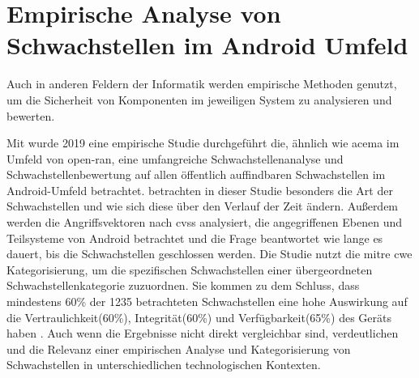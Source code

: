 \section{Empirische Analyse von Schwachstellen im Android Umfeld}
\label{sec:forschungsstand-android}
Auch in anderen Feldern der Informatik werden empirische Methoden genutzt, um die Sicherheit von Komponenten im jeweiligen System zu analysieren und bewerten.
\par Mit  wurde 2019 eine empirische Studie durchgeführt die, ähnlich wie \gls{acema} im Umfeld von \gls{open-ran}, eine umfangreiche Schwachstellenanalyse und Schwachstellenbewertung auf allen öffentlich auffindbaren Schwachstellen im Android-Umfeld betrachtet. \citeauthor{mazuera-rozoAndroidOSStack2019} betrachten in dieser Studie besonders die Art der Schwachstellen und wie sich diese über den Verlauf der Zeit ändern. Außerdem werden die Angriffsvektoren nach \gls{cvss} analysiert, die angegriffenen Ebenen und Teilsysteme von Android betrachtet und die Frage beantwortet wie lange es dauert, bis die Schwachstellen geschlossen werden. Die Studie nutzt die \gls{mitre} \gls{cwe} Kategorisierung, um die spezifischen Schwachstellen einer übergeordneten Schwachstellenkategorie zuzuordnen. Sie kommen zu dem Schluss, dass mindestens 60\% der 1235 betrachteten Schwachstellen eine hohe Auswirkung auf die Vertraulichkeit(60\%), Integrität(60\%) und Verfügbarkeit(65\%) des Geräts haben \autocite{mazuera-rozoAndroidOSStack2019}. Auch wenn die Ergebnisse nicht direkt vergleichbar sind, verdeutlichen \autocite{mazuera-rozoAndroidOSStack2019} und \autocite{klementSecuring6GTransition2024} die Relevanz einer empirischen Analyse und Kategorisierung von Schwachstellen in unterschiedlichen technologischen Kontexten.